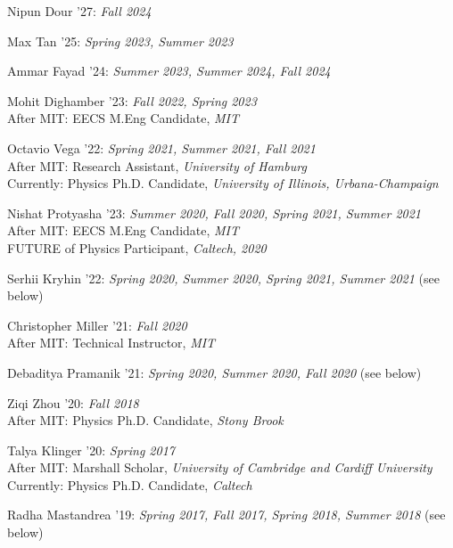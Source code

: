 \bbl

\item Nipun Dour '27: \emph{Fall 2024}

\item Max Tan '25: \emph{Spring 2023, Summer 2023}

\item Ammar Fayad '24: \emph{Summer 2023, Summer 2024, Fall 2024}

\item Mohit Dighamber '23: \emph{Fall 2022, Spring 2023}
\\ After MIT: EECS M.Eng Candidate, \emph{MIT}

\item Octavio Vega '22: \emph{Spring 2021, Summer 2021, Fall 2021}
\\ After MIT: Research Assistant, \emph{University of Hamburg}
\\ Currently: Physics Ph.D. Candidate, \emph{University of Illinois, Urbana-Champaign}

\item Nishat Protyasha '23: \emph{Summer 2020, Fall 2020, Spring 2021, Summer 2021}
\\ After MIT: EECS M.Eng Candidate, \emph{MIT}
\\ FUTURE of Physics Participant, \emph{Caltech, 2020}

\item Serhii Kryhin '22: \emph{Spring 2020, Summer 2020, Spring 2021, Summer 2021} (see below) 

\item Christopher Miller '21: \emph{Fall 2020}
\\ After MIT: Technical Instructor, \emph{MIT}

\item Debaditya Pramanik '21: \emph{Spring 2020, Summer 2020, Fall 2020} (see below) 

\item Ziqi Zhou '20: \emph{Fall 2018}
\\ After MIT: Physics Ph.D. Candidate, \emph{Stony Brook}

\item Talya Klinger '20: \emph{Spring 2017}
\\ After MIT: Marshall Scholar, \emph{University of Cambridge and Cardiff University}
\\ Currently: Physics Ph.D. Candidate, \emph{Caltech}

\item Radha Mastandrea '19: \emph{Spring 2017, Fall 2017, Spring 2018, Summer 2018} (see below) 

